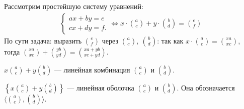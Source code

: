 Рассмотрим простейшую систему уравнений: 
\begin{align*}
    \begin{cases}
        ax + by = e \\
        cx + dy = f.
    \end{cases} \iff x \cdot\binom{a}{c} + y \cdot \binom{b}{d} = \binom{e}{f}
\end{align*}
По сути задача: выразить $\binom{e}{f}$ через $\binom{a}{c},\ \binom{b}{d}$: так как  $x \cdot \binom{a}{c} = \binom{xa}{xc}$, тогда  $\binom{xa}{xc} + \binom{yb}{yd} = \binom{xa + yb}{xc + yd}$.

\begin{definition}
 $x\binom{a}{c} + y\binom{b}{d}$ --- линейная комбинация  $\binom{a}{c}$ и  $\binom{b}{d}$.
\end{definition}
\begin{definition}
    $\left\{x \binom{a}{c} + y \binom{b}{d}\right\}$ --- линейная оболочка  $\binom{a}{c}$ и  $\binom{b}{d}$. Она обозначается  $\langle \binom{a}{c}, \binom{b}{d} \rangle$.
\end{definition}
